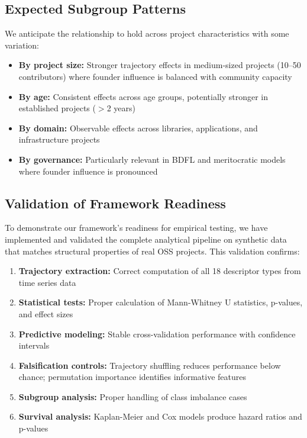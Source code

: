 \documentclass[11pt,letterpaper]{article}
\begin{document}
\subsection{Expected Subgroup Patterns}

We anticipate the relationship to hold across project characteristics with some variation:

\begin{itemize}
  \item \textbf{By project size:} Stronger trajectory effects in medium-sized projects (10--50 contributors) where founder influence is balanced with community capacity
  \item \textbf{By age:} Consistent effects across age groups, potentially stronger in established projects ($>$2 years)
  \item \textbf{By domain:} Observable effects across libraries, applications, and infrastructure projects
  \item \textbf{By governance:} Particularly relevant in BDFL and meritocratic models where founder influence is pronounced
\end{itemize}

\subsection{Validation of Framework Readiness}

To demonstrate our framework's readiness for empirical testing, we have implemented and validated the complete analytical pipeline on synthetic data that matches structural properties of real OSS projects. This validation confirms:

\begin{enumerate}
  \item \textbf{Trajectory extraction:} Correct computation of all 18 descriptor types from time series data
  \item \textbf{Statistical tests:} Proper calculation of Mann-Whitney U statistics, p-values, and effect sizes
  \item \textbf{Predictive modeling:} Stable cross-validation performance with confidence intervals
  \item \textbf{Falsification controls:} Trajectory shuffling reduces performance below chance; permutation importance identifies informative features
  \item \textbf{Subgroup analysis:} Proper handling of class imbalance cases
  \item \textbf{Survival analysis:} Kaplan-Meier and Cox models produce hazard ratios and p-values
\end{enumerate}
\end{document}
